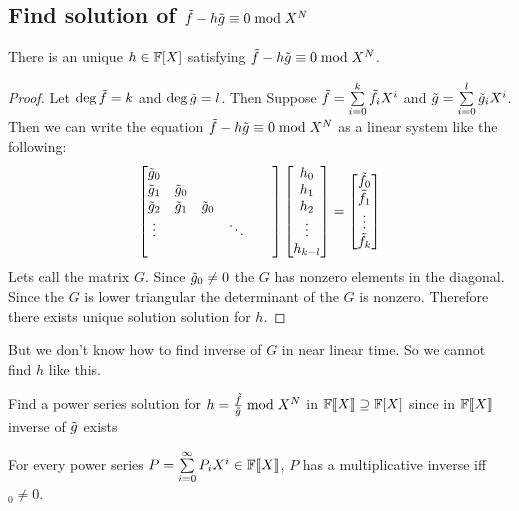 \subsection{Find solution of \texorpdfstring{$\tilde{f}-h\tilde{g}\equiv 0\bmod {X^N}$}{f-fg=0 mod X\^N}}
\begin{algoprob}
\end{algoprob}
\begin{lemma}{}{}
	There is an unique $h\in\mathbb{F}[X]$ satisfying $\tilde{f}-h\tilde{g}\equiv 0\bmod{X^N}$.
\end{lemma}
\begin{proof}
	Let $\deg \tilde{f}=k$ and $\deg\tilde{g}=l$. Then Suppose $\tilde{f}=\sum\limits_{i=0}^k\tilde{f}_iX^i$ and $\tilde{g}=\sum\limits_{i=0}^l\tilde{g}_iX^i$. Then we can write the equation  $\tilde{f}-h\tilde{g}\equiv 0\bmod{X^N}$ as a linear system like the following: $$\left[\begin{matrix}\tilde{g}_0 & \\ \tilde{g}_1 & \tilde{g}_0&\\ \tilde{g}_2&\tilde{g}_1&\tilde{g}_0 & \\ \vdots
		& & & \ddots & \\ & & & & &\end{matrix}\right]\left[\begin{matrix}h_0\\ h_1 \\ h_2\\ \vdots \\ h_{k-l}\end{matrix}\right]=\left[\begin{matrix}\tilde{f}_0\\ \tilde{f}_1\\ \vdots \\ \tilde{f}_k\end{matrix}\right]$$Lets call the matrix $G$. Since $\tilde{g}_0\neq 0$ the $G$ has nonzero elements in the diagonal. Since the $G$ is lower triangular the determinant of the $G$ is nonzero. Therefore there exists unique solution solution for $h$.
\end{proof}

But we don't know how to find inverse of $G$ in near linear time. So we cannot find $h$ like this.
\begin{idea*}
	Find a power series solution for $h=\frac{\tilde{f}}{\tilde{g}}\bmod {X^N}$ in $\mathbb{F}\llbracket X\rrbracket\supseteq \mathbb{F}[X]$ since in $\mathbb{F}\llbracket X\rrbracket$ inverse of $\tilde{g}$ exists
\end{idea*}
\begin{lemma}{}{}
	For every power series $P=\sum\limits_{i=0}^{\infty}P_iX^i\in\mathbb{F}\llbracket X\rrbracket$, $P$ has a multiplicative inverse iff $_0\neq 0$.
\end{lemma}